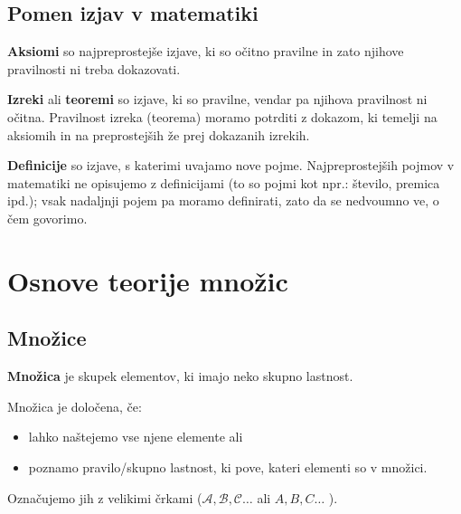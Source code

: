          

         
             \section{Pomen izjav v matematiki}
              
                \textbf{Aksiomi} so najpreprostejše izjave, ki so očitno pravilne in zato njihove 
                pravilnosti ni treba dokazovati.
             
              
                \textbf{Izreki} ali \textbf{teoremi} so izjave, ki so pravilne, vendar pa njihova 
                pravilnost ni očitna. 
                Pravilnost izreka (teorema) moramo potrditi z dokazom, ki temelji na aksiomih in na 
                preprostejših že prej dokazanih izrekih.
             
              
                \textbf{Definicije} so izjave, s katerimi uvajamo nove pojme. Najpreprostejših pojmov 
                v matematiki ne opisujemo z definicijami (to so pojmi kot npr.: število, premica ipd.); 
                vsak nadaljnji pojem pa moramo definirati, zato da se nedvoumno ve, o čem govorimo.
             

         





        
\chapter{Osnove teorije množic}


    
        \section{Množice}
        
            \textbf{Množica} je skupek elementov, ki imajo neko skupno lastnost.
        

            Množica je določena, če:
            \begin{itemize}
                \item lahko naštejemo vse njene elemente ali
                \item poznamo pravilo/skupno lastnost, ki pove, kateri elementi so v množici.
            \end{itemize}

            Označujemo jih z velikimi črkami ($\mathcal{A}, \mathcal{B}, \mathcal{C} \dots$ ali  
            $A, B, C \dots$ ). 
            \newline

